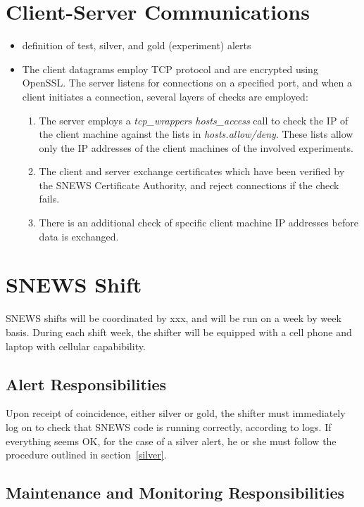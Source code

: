 \documentclass{article}
\begin{document}
\section{Client-Server Communications}
\begin{itemize}
\item definition of test, silver, and gold (experiment) alerts
\item The client datagrams employ TCP protocol and 
are encrypted using OpenSSL.  
The server listens for connections on a specified port,
and when a client initiates a connection, several layers
of checks are employed:
\begin{enumerate}
\item The server employs a {\it tcp\_wrappers hosts\_access}
call to check the IP of the client machine against the lists in
{\it hosts.allow/deny}.  These lists allow only the IP addresses
of the client machines of the involved experiments.
\item
The client and server exchange certificates which have been
verified by the SNEWS Certificate Authority, and reject
connections if the check fails.
\item There is an additional check of specific client machine
IP addresses before data is exchanged.
\end{enumerate}
\end{itemize}

\section{SNEWS Shift}

SNEWS shifts will be coordinated by xxx, and will be run on
a week by week basis.  During each shift week, the shifter will
be equipped with a cell phone and laptop with cellular
capabibility.

\subsection{Alert Responsibilities}

Upon receipt of coincidence, either silver or gold, the shifter
must immediately log on to check that SNEWS code is running
correctly, according to logs.  If everything seems OK, for 
the case of a silver alert, he or she must follow the procedure
outlined in section~\ref{silver}.

\subsection{Maintenance and Monitoring Responsibilities}
\end{document}
